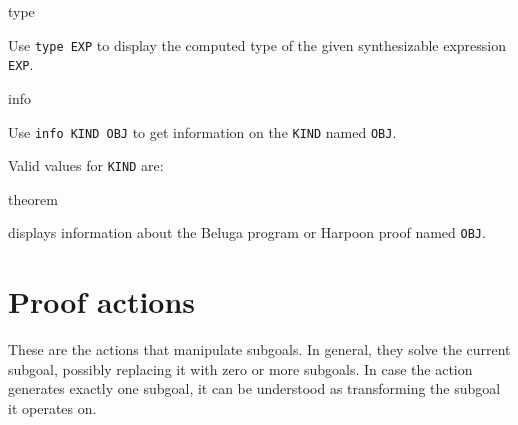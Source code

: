\begin{description}
\item{\ttfamily type}

Use \texttt{type EXP} to display the computed type of the given synthesizable
expression \texttt{EXP}.

\item{\ttfamily info}

Use \texttt{info KIND OBJ} to get information on the \texttt{KIND} named \texttt{OBJ}.

Valid values for \texttt{KIND} are:
\begin{description}
\item{\ttfamily theorem}

  displays information about the Beluga program or Harpoon proof
  named \texttt{OBJ}.
\end{description}
\end{description}

\section{Proof actions}%
\label{sec:proof-tactics}

These are the actions that manipulate subgoals. In general, they solve the
current subgoal, possibly replacing it with zero or more subgoals.
In case the action generates exactly one subgoal, it can be understood as
transforming the subgoal it operates on.

